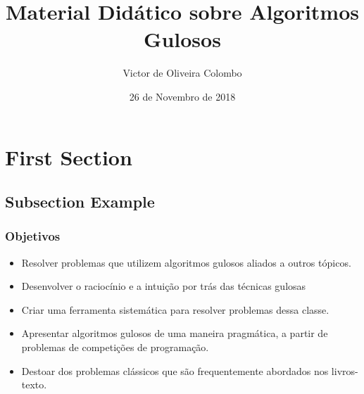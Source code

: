 \documentclass{beamer}
\title[Algoritmos Gulosos]{Material Didático sobre Algoritmos Gulosos} %
\author{Victor de Oliveira Colombo} %
\institute[IME-USP] %
{
Instituto de Matemática e Estatística da Universidade de São Paulo \\ %
\medskip
\textit{victor.colombo@usp.br} %
}
\date{26 de Novembro de 2018} %
\begin{document}
\begin{frame}
\titlepage %
\end{frame}



\section{First Section} %

\subsection{Subsection Example} %

\begin{frame}
\frametitle{Objetivos}
\begin{itemize}

\item Resolver problemas que utilizem algoritmos gulosos aliados a outros tópicos.

\item Desenvolver o raciocínio e a intuição por trás das técnicas gulosas

\item Criar uma ferramenta sistemática para resolver problemas dessa classe.

\item Apresentar algoritmos gulosos de uma maneira pragmática, a partir de problemas
de competições de programação.

\item Destoar dos problemas clássicos que são frequentemente abordados nos livros-texto.
\end{itemize}
\end{frame}
\end{document}
